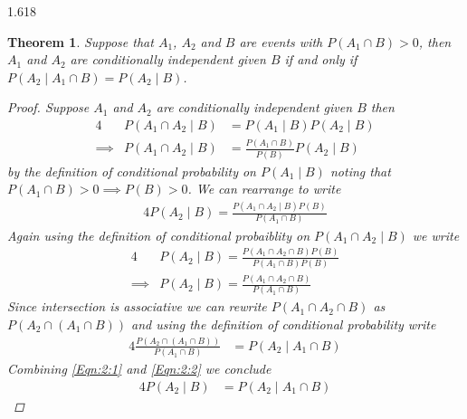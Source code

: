 \documentclass[11pt, oneside]{book}   	%
\newtheorem{theorem}{Theorem}[chapter]
\begin{document}
\begin{spacing}{1.618}
		\begin{theorem}
			Suppose that $A_1$, $A_2$ and $B$ are events with $P(A_1\cap B)>0$, then $A_1$ and $A_2$ are conditionally independent given $B$ if and only if $P(A_2\mid A_1\cap B)=P(A_2\mid B)$. 
			\begin{proof}
				Suppose $A_1$ and $A_2$ are conditionally independent given $B$ then 
				\begin{alignat}{4}
					&P(A_1\cap A_2\mid B)&=P(A_1\mid B)P(A_2\mid B) \\
					\implies & P(A_1\cap A_2\mid B)&=\frac{P(A_1\cap B)}{P(B)}P(A_2\mid B)
				\end{alignat}
				by the definition of conditional probability on $P(A_1\mid B)$ noting that $P(A_1\cap B)>0\implies P(B)>0$. We can rearrange to write 
				\begin{alignat}{4}
					P(A_2\mid B)=\frac{P(A_1\cap A_2\mid B)P(B)}{P(A_1\cap B)}
				\end{alignat}
				Again using the definition of conditional probaiblity on $P(A_1\cap A_2\mid B)$ we write
				\begin{alignat}{4}
					&P(A_2\mid B)=\frac{P(A_1\cap A_2\cap B)P(B)}{P(A_1\cap B)P(B)} \\
					\implies & P(A_2\mid B)=\frac{P(A_1\cap A_2\cap B)}{P(A_1\cap B)} \label{Eqn:2:1}
				\end{alignat}
				Since intersection is associative we can rewrite $P(A_1\cap A_2\cap B)$ as $P(A_2 \cap (A_1\cap B))$ and using the definition of conditional probability write 
				\begin{alignat}{4}
					\frac{P(A_2 \cap (A_1\cap B))}{P(A_1\cap B)} &= P(A_2\mid A_1\cap B) \label{Eqn:2:2}
				\end{alignat}
				Combining \ref{Eqn:2:1} and \ref{Eqn:2:2} we conclude
				\begin{alignat}{4}
					P(A_2\mid B)&=P(A_2\mid A_1\cap B)
				\end{alignat}
				

\end{proof}
\end{theorem}
\end{spacing}
\end{document}
